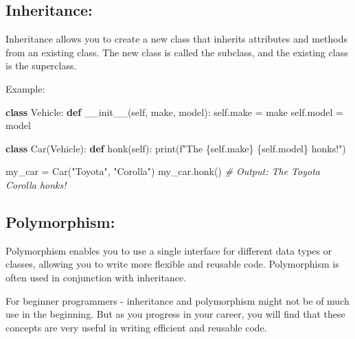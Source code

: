 \documentclass[
  paper=a4,
  ,captions=tableheading
]{scrartcl}
\newenvironment{Shaded}{}{}
\newcommand{\BuiltInTok}[1]{\textcolor[rgb]{0.00,0.50,0.00}{#1}}
\newcommand{\CommentTok}[1]{\textcolor[rgb]{0.38,0.63,0.69}{\textit{#1}}}
\newcommand{\FunctionTok}[1]{\textcolor[rgb]{0.02,0.16,0.49}{#1}}
\newcommand{\KeywordTok}[1]{\textcolor[rgb]{0.00,0.44,0.13}{\textbf{#1}}}
\newcommand{\NormalTok}[1]{#1}
\newcommand{\OperatorTok}[1]{\textcolor[rgb]{0.40,0.40,0.40}{#1}}
\newcommand{\SpecialCharTok}[1]{\textcolor[rgb]{0.25,0.44,0.63}{#1}}
\newcommand{\SpecialStringTok}[1]{\textcolor[rgb]{0.73,0.40,0.53}{#1}}
\newcommand{\StringTok}[1]{\textcolor[rgb]{0.25,0.44,0.63}{#1}}
\newcommand{\VariableTok}[1]{\textcolor[rgb]{0.10,0.09,0.49}{#1}}
\begin{document}
\hypertarget{inheritance}{%
\subsection{Inheritance:}\label{inheritance}}

Inheritance allows you to create a new class that inherits attributes
and methods from an existing class. The new class is called the
subclass, and the existing class is the superclass.

Example:

\begin{Shaded}
\begin{Highlighting}[]
\KeywordTok{class}\NormalTok{ Vehicle:}
    \KeywordTok{def} \FunctionTok{\_\_init\_\_}\NormalTok{(}\VariableTok{self}\NormalTok{, make, model):}
        \VariableTok{self}\NormalTok{.make }\OperatorTok{=}\NormalTok{ make}
        \VariableTok{self}\NormalTok{.model }\OperatorTok{=}\NormalTok{ model}

\KeywordTok{class}\NormalTok{ Car(Vehicle):}
    \KeywordTok{def}\NormalTok{ honk(}\VariableTok{self}\NormalTok{):}
        \BuiltInTok{print}\NormalTok{(}\SpecialStringTok{f"The }\SpecialCharTok{\{}\VariableTok{self}\SpecialCharTok{.}\NormalTok{make}\SpecialCharTok{\}}\SpecialStringTok{ }\SpecialCharTok{\{}\VariableTok{self}\SpecialCharTok{.}\NormalTok{model}\SpecialCharTok{\}}\SpecialStringTok{ honks!"}\NormalTok{)}

\NormalTok{my\_car }\OperatorTok{=}\NormalTok{ Car(}\StringTok{"Toyota"}\NormalTok{, }\StringTok{"Corolla"}\NormalTok{)}
\NormalTok{my\_car.honk()  }\CommentTok{\# Output: The Toyota Corolla honks!}
\end{Highlighting}
\end{Shaded}

\hypertarget{polymorphism}{%
\subsection{Polymorphism:}\label{polymorphism}}

Polymorphism enables you to use a single interface for different data
types or classes, allowing you to write more flexible and reusable code.
Polymorphism is often used in conjunction with inheritance.

For beginner programmers - inheritance and polymorphism might not be of
much use in the beginning. But as you progress in your career, you will
find that these concepts are very useful in writing efficient and
reusable code.
\end{document}

